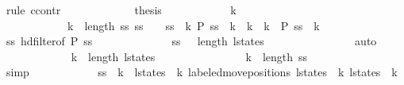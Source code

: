 \begin{isabellebody}
\ {\isacharparenleft}rule\ ccontr{\isacharparenright}\isanewline
\ \ \ \ \ \ \ \ \ \ \isamarkupfalse%
\ {\isachardoublequoteopen}{\isasymnot}\ {\isacharquery}thesis{\isachardoublequoteclose}\isanewline
\ \ \ \ \ \ \ \ \ \ \isamarkupfalse%
\ k\ \ \isanewline
\ \ \ \ \ \ \ \ \ \ \ \ {\isachardoublequoteopen}k\ {\isacharless}\ length\ {\isacharquery}ss{\isachardoublequoteclose}\ {\isachardoublequoteopen}ss\ {\isacharbang}\ {}\ {\isacharequal}\ {\isacharquery}ss\ {\isacharbang}\ k{\isachardoublequoteclose}\ {\isachardoublequoteopen}{\isacharquery}P\ {\isacharparenleft}{\isacharquery}ss\ {\isacharbang}\ k{\isacharparenright}{\isachardoublequoteclose}\ {\isachardoublequoteopen}{\isasymforall}\ k{\isacharprime}\ {\isacharless}\ k{\isachardot}\ {\isasymnot}\ {\isacharquery}P\ {\isacharparenleft}{\isacharquery}ss\ {\isacharbang}\ k{\isacharprime}{\isacharparenright}{\isachardoublequoteclose}\isanewline
\ \ \ \ \ \ \ \ \ \ \ \ \isamarkupfalse%
\ ss\ hd{\isacharunderscore}filter{\isacharbrackleft}of\ {\isacharquery}P\ {\isacharquery}ss{\isacharbrackright}\isanewline
\ \ \ \ \ \ \ \ \ \ \ \ \isamarkupfalse%
\ {\isacharbackquoteopen}ss\ {\isasymnoteq}\ {\isacharbrackleft}{\isacharbrackright}{\isacharbackquoteclose}\ {\isacharbackquoteopen}length\ l{\isacharunderscore}states\ {\isasymge}\ {}{\isacharbackquoteclose}\isanewline
\ \ \ \ \ \ \ \ \ \ \ \ \isamarkupfalse%
\ auto\isanewline
\ \ \ \ \ \ \ \ \ \ \isamarkupfalse%
\ \ {\isachardoublequoteopen}k\ {\isacharless}\ length\ l{\isacharunderscore}states\ {\isacharminus}\ {}{\isachardoublequoteclose}\isanewline
\ \ \ \ \ \ \ \ \ \ \ \ \isamarkupfalse%
\ {\isacharbackquoteopen}k\ {\isacharless}\ length\ {\isacharquery}ss{\isacharbackquoteclose}\isanewline
\ \ \ \ \ \ \ \ \ \ \ \ \isamarkupfalse%
\ simp\isanewline
\ \ \ \ \ \ \ \ \ \ \isamarkupfalse%
\ {\isachardoublequoteopen}{\isacharquery}ss\ {\isacharbang}\ k\ {\isacharequal}\ {\isacharparenleft}l{\isacharunderscore}states\ {\isacharbang}\ k{\isacharcomma}\ labeled{\isacharunderscore}move{\isacharunderscore}positions\ {\isacharparenleft}l{\isacharunderscore}states\ {\isacharbang}\ k{\isacharparenright}\ {\isacharparenleft}l{\isacharunderscore}states\ {\isacharbang}\ {\isacharparenleft}k{\isacharplus}{}{\isacharparenright}{\isacharparenright}{\isacharparenright}{\isachardoublequoteclose}\isanewline
\ \ \ \ \ \ \ \ \ \ \ \ \isamarkupfalse%

\end{isabellebody}

